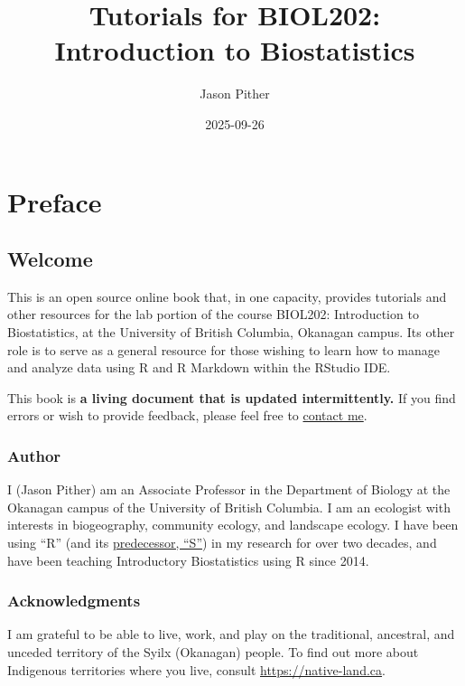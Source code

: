 \documentclass[
]{book}
\title{Tutorials for BIOL202: Introduction to Biostatistics}
\author{Jason Pither}
\date{2025-09-26}
\begin{document}
\maketitle

{
\setcounter{tocdepth}{1}
\tableofcontents
}
\part*{Preface}\label{part-preface}

\chapter*{Welcome}\label{welcome}

This is an open source online book that, in one capacity, provides tutorials and other resources for the lab portion of the course BIOL202: Introduction to Biostatistics, at the University of British Columbia, Okanagan campus. Its other role is to serve as a general resource for those wishing to learn how to manage and analyze data using R and R Markdown within the RStudio IDE.

This book is \textbf{a living document that is updated intermittently.} If you find errors or wish to provide feedback, please feel free to \href{https://jasonpither.weebly.com/people.html}{contact me}.

\section*{Author}\label{author}

I (Jason Pither) am an Associate Professor in the Department of Biology at the Okanagan campus of the University of British Columbia. I am an ecologist with interests in biogeography, community ecology, and landscape ecology. I have been using ``R'' (and its \href{https://en.wikipedia.org/wiki/R_(programming_language)\#History}{predecessor, ``S''}) in my research for over two decades, and have been teaching Introductory Biostatistics using R since 2014.

\section*{Acknowledgments}\label{acknowledgments}

I am grateful to be able to live, work, and play on the traditional, ancestral, and unceded territory of the Syilx (Okanagan) people. To find out more about Indigenous territories where you live, consult \url{https://native-land.ca}.
\end{document}

